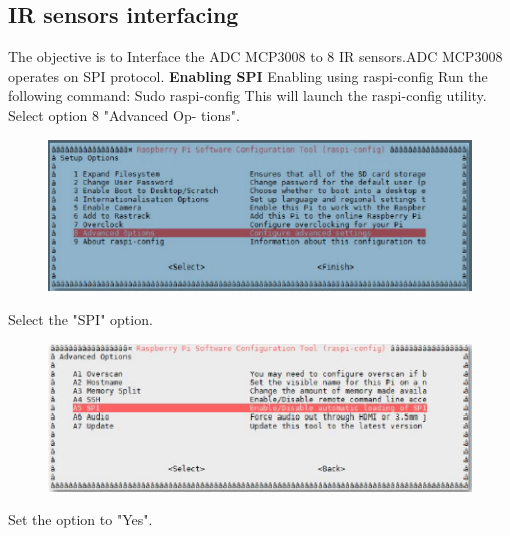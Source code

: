\documentclass[11pt,a4paper]{report}
\begin{document}
\begin{flushleft}
	\subsection{IR sensors  interfacing}
	The objective is to Interface the ADC MCP3008 to 8 IR sensors.ADC MCP3008 operates on SPI protocol. \vspace{0.2cm}\newline
	\textbf{Enabling SPI}\vspace{0.2cm}\newline
	Enabling using raspi-config\newline
	Run the following command:\newline
Sudo raspi-config\newline
This will launch the raspi-config utility. Select option 8 "Advanced Op-
tions".\newline
\begin{figure}[h!]
		\includegraphics[scale=0.7]{spi1.png}
		\centering
		\caption{}
	    \end{figure}\newline
Select the "SPI" option.\newline
\begin{figure}[h!]
		\includegraphics[scale=0.7]{spi2.png}
		\centering
		\caption{}
	    \end{figure}\newline
	    Set the option to "Yes".\newline
	   

\end{flushleft}
\end{document}
